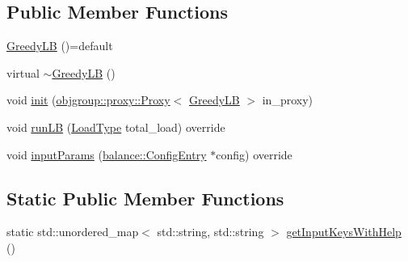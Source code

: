 \subsection*{Public Member Functions}
\begin{DoxyCompactItemize}
\item 
\hyperlink{structvt_1_1vrt_1_1collection_1_1lb_1_1_greedy_l_b_a01292f5239d26023d8ff15bccfb9a501}{Greedy\+LB} ()=default
\item 
virtual \hyperlink{structvt_1_1vrt_1_1collection_1_1lb_1_1_greedy_l_b_a234935b9bb58ef4b7680be7540035c6f}{$\sim$\+Greedy\+LB} ()
\item 
void \hyperlink{structvt_1_1vrt_1_1collection_1_1lb_1_1_greedy_l_b_abfbe5625bf35d88c192aa46b83c4670a}{init} (\hyperlink{structvt_1_1objgroup_1_1proxy_1_1_proxy}{objgroup\+::proxy\+::\+Proxy}$<$ \hyperlink{structvt_1_1vrt_1_1collection_1_1lb_1_1_greedy_l_b}{Greedy\+LB} $>$ in\+\_\+proxy)
\item 
void \hyperlink{structvt_1_1vrt_1_1collection_1_1lb_1_1_greedy_l_b_abe03de3d4ee3b1259707a9d5b22a7b9c}{run\+LB} (\hyperlink{namespacevt_a8fb51741340b87d7aaee0bef60e9896b}{Load\+Type} total\+\_\+load) override
\item 
void \hyperlink{structvt_1_1vrt_1_1collection_1_1lb_1_1_greedy_l_b_a162618c3e7867f9d3e97173a675e5a90}{input\+Params} (\hyperlink{structvt_1_1vrt_1_1collection_1_1balance_1_1_config_entry}{balance\+::\+Config\+Entry} $\ast$config) override
\end{DoxyCompactItemize}
\subsection*{Static Public Member Functions}
\begin{DoxyCompactItemize}
\item 
static std\+::unordered\+\_\+map$<$ std\+::string, std\+::string $>$ \hyperlink{structvt_1_1vrt_1_1collection_1_1lb_1_1_greedy_l_b_aaa09de535f0f5422945c06950ebd2373}{get\+Input\+Keys\+With\+Help} ()
\end{DoxyCompactItemize}
